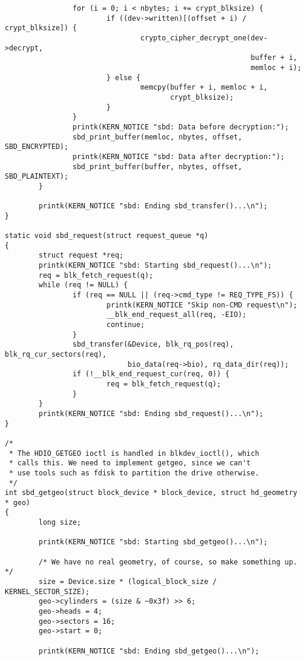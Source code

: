 \documentclass[letterpaper,10pt,titlepage,draftclsnofoot,onecolumn]{article}
\begin{document}
\begin{lstlisting}
                for (i = 0; i < nbytes; i += crypt_blksize) {
                        if ((dev->written)[(offset + i) / crypt_blksize]) {
                                crypto_cipher_decrypt_one(dev->decrypt,
                                                          buffer + i,
                                                          memloc + i);
                        } else {
                                memcpy(buffer + i, memloc + i,
                                       crypt_blksize);
                        }
                }
                printk(KERN_NOTICE "sbd: Data before decryption:");
                sbd_print_buffer(memloc, nbytes, offset, SBD_ENCRYPTED);
                printk(KERN_NOTICE "sbd: Data after decryption:");
                sbd_print_buffer(buffer, nbytes, offset, SBD_PLAINTEXT);
        }

        printk(KERN_NOTICE "sbd: Ending sbd_transfer()...\n");
}

static void sbd_request(struct request_queue *q)
{
        struct request *req;
        printk(KERN_NOTICE "sbd: Starting sbd_request()...\n");
        req = blk_fetch_request(q);
        while (req != NULL) {
                if (req == NULL || (req->cmd_type != REQ_TYPE_FS)) {
                        printk(KERN_NOTICE "Skip non-CMD request\n");
                        __blk_end_request_all(req, -EIO);
                        continue;
                }
                sbd_transfer(&Device, blk_rq_pos(req), blk_rq_cur_sectors(req),
                             bio_data(req->bio), rq_data_dir(req));
                if (!__blk_end_request_cur(req, 0)) {
                        req = blk_fetch_request(q);
                }
        }
        printk(KERN_NOTICE "sbd: Ending sbd_request()...\n");
}

/*
 * The HDIO_GETGEO ioctl is handled in blkdev_ioctl(), which
 * calls this. We need to implement getgeo, since we can't
 * use tools such as fdisk to partition the drive otherwise.
 */
int sbd_getgeo(struct block_device * block_device, struct hd_geometry * geo)
{
        long size;

        printk(KERN_NOTICE "sbd: Starting sbd_getgeo()...\n");

        /* We have no real geometry, of course, so make something up. */
        size = Device.size * (logical_block_size / KERNEL_SECTOR_SIZE);
        geo->cylinders = (size & ~0x3f) >> 6;
        geo->heads = 4;
        geo->sectors = 16;
        geo->start = 0;

        printk(KERN_NOTICE "sbd: Ending sbd_getgeo()...\n");


\end{lstlisting}
\end{document}
